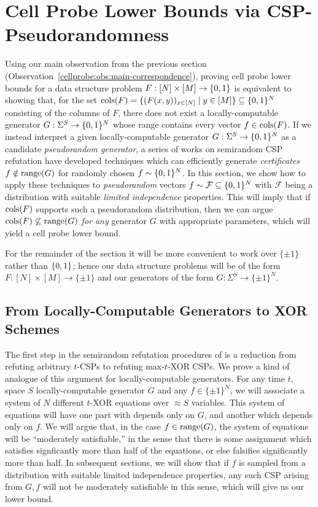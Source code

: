 \section{Cell Probe Lower Bounds via CSP-Pseudorandomness}\label{cellprobe:sec:indep-lbs}

Using our main observation from the previous section 
(Observation~\ref{cellprobe:obs:main-correspondence}), proving cell probe lower bounds for a data structure problem $F : [N] \times [M] \to \{0,1\}$ is equivalent to showing that, for the set $\mathrm{cols}(F) = \{(F(x,y))_{ x\in [N]} \mid y \in [M]\}\subseteq \{0,1\}^N$ consisting of the columns of $F$, there does not exist a locally-computable generator $G: \Sigma^S \to \{0,1\}^N$ whose range contains every vector $f\in \mathrm{cols}(F)$. 
If we instead interpret a given locally-computable generator $G: \Sigma^S \to \{0,1\}^N$ as a candidate \emph{pseudorandom generator}, a series of works on semirandom CSP refutation \cite{feige-semirandom,aow,semirandom,smoothed,simpler-moore} have developed techniques which can efficiently generate \emph{certificates} $f \notin \mathrm{range}(G)$ for randomly chosen $f \sim \{0,1\}^N$. In this section, we show how to apply these techniques to \emph{pseudorandom} vectors $f \sim \mathcal{F} \subseteq \{0,1\}^N$ with $\mathcal{F}$ being a distribution with suitable \emph{limited independence} properties. This will imply that if $\mathrm{cols}(F)$ supports such a pseudorandom distribution, then we can argue $\mathrm{cols}(F) \not\subseteq \mathrm{range}(G)$ \emph{for any} generator $G$ with appropriate parameters, which will yield a cell probe lower bound. 


For the remainder of the section it will be more convenient to work over $\{\pm 1\}$ rather than $\{0,1\}$; hence our data structure problems will be of the form $F: [N] \times [M] \to \{ \pm 1\}$ and our generators of the form $G: \Sigma^S \to \{\pm 1\}^N$. 

\subsection{From Locally-Computable Generators to XOR Schemes}
The first step in the semirandom refutation procedures of \cite{feige-semirandom,semirandom,smoothed} is a reduction from refuting arbitrary $t$-CSPs to refuting max-$t$-XOR CSPs. We prove a kind of analogue of this argument for locally-computable generators. For any time $t$, space $S$ locally-computable generator $G$ and any $f \in \{\pm 1\}^N$, we will associate a system of $N$ different $t$-XOR equations over $\approx S$ variables. This system of equations will have one part with depends only on $G$, and another which depends only on $f$. We will argue that, in the case $f \in \mathrm{range}(G)$, the system of equations will be ``moderately satisfiable,'' in the sense that there is some assignment which satisfies signficantly more than half of the equations, or else falsifies significantly more than half. In subsequent sections, we will show that if $f$ is sampled from a distribution with suitable limited independence properties, any such CSP arising from $G,f$ will not be moderately satisfiable in this sense, which will give us our lower bound.

